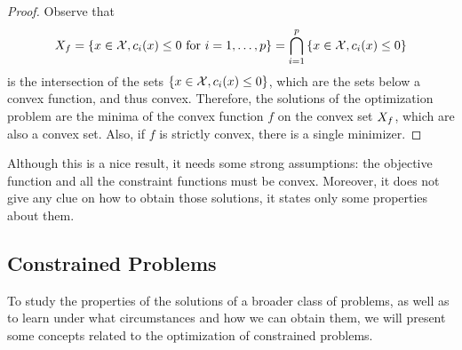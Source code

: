 \begin{proof}
    Observe that
    $$X_f = \left\{x \in \mathcal{X}, c_i(x) \leq 0 \text{ for } i=1, \ldots, p\right\} = \bigcap_{i=1}^p \left\{x \in \mathcal{X}, c_i(x) \leq 0\right\}$$ 
    is the intersection of the sets $\left\{x \in \mathcal{X}, c_i(x) \leq 0\right\}$, which are the sets below a convex function, and thus convex. Therefore, the solutions of the optimization problem are the minima of the convex function $f$ on the convex set $X_f$, which are also a convex set.
    Also, if $f$ is strictly convex, there is a single minimizer.
\end{proof}
Although this is a nice result, it needs some strong assumptions: the objective function and all the constraint functions must be convex. Moreover, it does not give any clue on how to obtain those solutions, it states only some properties about them.
%






\subsection{Constrained Problems}
To study the properties of the solutions of a broader class of problems, as well as to learn under what circumstances and how we can obtain them, we will present some concepts related to the optimization of constrained problems.
%

